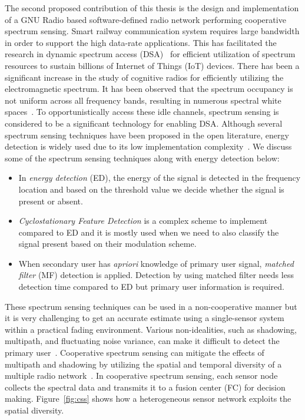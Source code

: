 The second proposed contribution of this thesis is the design and implementation of a GNU Radio based software-defined radio network performing cooperative spectrum sensing. Smart railway communication system requires large bandwidth in order to support the high data-rate applications. This has facilitated the research in dynamic spectrum access (DSA)~\cite{arhtn2,arhtn3} for efficient utilization of spectrum resources to sustain billions of Internet of Things (IoT) devices. There has been a significant increase in the study of cognitive radios for efficiently utilizing the electromagnetic spectrum. It has been observed that the spectrum occupancy is not uniform across all frequency bands, resulting in numerous spectral white spaces~\cite{bookhtn1}. To opportunistically access these idle channels, spectrum sensing is considered to be a significant technology for enabling DSA. Although several spectrum sensing techniques have been proposed in the open literature, energy detection is widely used due to its low implementation complexity~\cite{arhtn4}. We discuss some of the spectrum sensing techniques along with energy detection below:
\begin{itemize}
\item In \textit{energy detection} (ED), the energy of the signal is detected in the frequency location and based on the threshold value we decide whether the signal is present or absent.

\item \textit{Cyclostationary Feature Detection} is a complex scheme to implement compared to ED and it is mostly used when we need to also classify the signal present based on their modulation scheme.

\item When secondary user has \textit{apriori} knowledge of primary user signal, \textit{matched  filter} (MF)  detection  is  applied. Detection by using matched filter needs less detection time compared to ED but primary user information is required.
\end{itemize}

These spectrum sensing techniques can be used in a non-cooperative manner but it is very challenging to get an accurate estimate using a single-sensor system within a practical fading environment. Various non-idealities, such as shadowing, multipath, and fluctuating noise variance, can make it difficult to detect the primary user~\cite{inphtn5,inphtn6}. Cooperative spectrum sensing can mitigate the effects of multipath and shadowing by utilizing the spatial and temporal diversity of a multiple radio network~\cite{inphtn7,inphtn8}. In cooperative spectrum sensing, each sensor node collects the spectral data and transmits it to a fusion center (FC) for decision making. Figure~\ref{fig:css} shows how a heterogeneous sensor network exploits the spatial diversity. 

